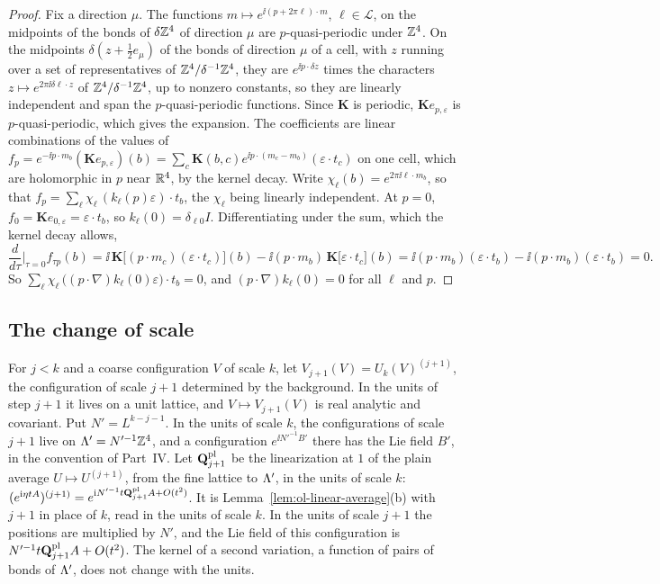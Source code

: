 \begin{proof}
Fix a direction $\mu$. The functions $m\mapsto e^{\ii(p+2\pi\ell)\cdot m}$, $\ell\in\mathcal L$, on the midpoints of the bonds of $\delta\mathbb Z^4$ of direction $\mu$ are $p$-quasi-periodic under $\mathbb Z^4$. On the midpoints $\delta(z+\frac12e_\mu)$ of the bonds of direction $\mu$ of a cell, with $z$ running over a set of representatives of $\mathbb Z^4/\delta^{-1}\mathbb Z^4$, they are $e^{\ii p\cdot\delta z}$ times the characters $z\mapsto e^{2\pi\ii\delta\ell\cdot z}$ of $\mathbb Z^4/\delta^{-1}\mathbb Z^4$, up to nonzero constants, so they are linearly independent and span the $p$-quasi-periodic functions. Since $\mathbf K$ is periodic, $\mathbf Ke_{p,\varepsilon}$ is $p$-quasi-periodic, which gives the expansion. The coefficients are linear combinations of the values of $f_p=e^{-\ii p\cdot m_b}(\mathbf Ke_{p,\varepsilon})(b)=\sum_c\mathbf K(b,c)e^{\ii p\cdot(m_c-m_b)}(\varepsilon\cdot t_c)$ on one cell, which are holomorphic in $p$ near $\mathbb R^4$, by the kernel decay. Write $\chi_\ell(b)=e^{2\pi\ii\ell\cdot m_b}$, so that $f_p=\sum_\ell\chi_\ell\,(k_\ell(p)\varepsilon)\cdot t_b$, the $\chi_\ell$ being linearly independent. At $p=0$, $f_0=\mathbf Ke_{0,\varepsilon}=\varepsilon\cdot t_b$, so $k_\ell(0)=\delta_{\ell0}I$. Differentiating under the sum, which the kernel decay allows,
\[
\frac d{d\tau}\Big|_{\tau=0}f_{\tau p}(b)=\ii\,\mathbf K\big[(p\cdot m_c)(\varepsilon\cdot t_c)\big](b)-\ii(p\cdot m_b)\,\mathbf K\big[\varepsilon\cdot t_c\big](b)=\ii(p\cdot m_b)(\varepsilon\cdot t_b)-\ii(p\cdot m_b)(\varepsilon\cdot t_b)=0 .
\]
So $\sum_\ell\chi_\ell\,\big((p\cdot\nabla)k_\ell(0)\varepsilon\big)\cdot t_b=0$, and $(p\cdot\nabla)k_\ell(0)=0$ for all $\ell$ and $p$.
\end{proof}

\subsection{The change of scale}\label{subsec:ol-scale}

For $j<k$ and a coarse configuration $V$ of scale $k$, let $V_{j+1}(V)=U_k(V)^{(j+1)}$, the configuration of scale $j+1$ determined by the background. In the units of step $j+1$ it lives on a unit lattice, and $V\mapsto V_{j+1}(V)$ is real analytic and covariant. Put $N'=L^{k-j-1}$. In the units of scale $k$, the configurations of scale $j+1$ live on $\Lambda'=N'^{-1}\mathbb Z^4$, and a configuration $e^{\ii N'^{-1}B'}$ there has the Lie field $B'$, in the convention of Part~IV. Let $\mathbf Q^{\rm pl}_{j+1}$ be the linearization at $1$ of the plain average $U\mapsto U^{(j+1)}$, from the fine lattice to $\Lambda'$, in the units of scale $k$: $(e^{\mathrm i\eta tA})^{(j+1)}=e^{\mathrm i N'^{-1}t\mathbf Q^{\rm pl}_{j+1}A+O(t^2)}$. It is Lemma~\ref{lem:ol-linear-average}(b) with $j+1$ in place of $k$, read in the units of scale $k$. In the units of scale $j+1$ the positions are multiplied by $N'$, and the Lie field of this configuration is $N'^{-1}t\mathbf Q^{\rm pl}_{j+1}A+O(t^2)$. The kernel of a second variation, a function of pairs of bonds of $\Lambda'$, does not change with the units.

